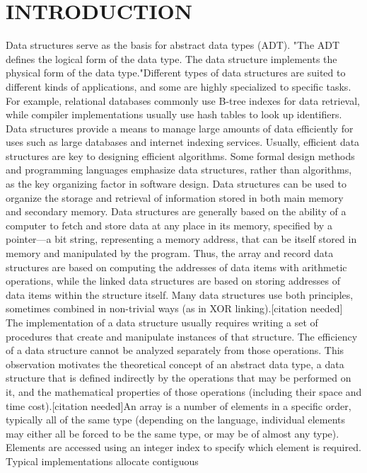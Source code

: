 \documentclass{article}
\begin{document}
\section*{INTRODUCTION}
Data structures serve as the basis for abstract data 
types (ADT). "The ADT defines the logical form of 
the data type. The data structure implements the 
physical form of the data type."Different types of data 
structures are suited to different kinds of applications, 
and some are highly specialized to specific tasks. For 
example, relational databases commonly use B-tree 
indexes for data retrieval, while compiler 
implementations usually use hash tables to look up 
identifiers. Data structures provide a means to manage 
large amounts of data efficiently for uses such as large 
databases and internet indexing services. Usually, 
efficient data structures are key to designing efficient 
algorithms. Some formal design methods and 
programming languages emphasize data structures, 
rather than algorithms, as the key organizing factor in 
software design. Data structures can be used to 
organize the storage and retrieval of information 
stored in both main memory and secondary memory. 
Data structures are generally based on the ability of a 
computer to fetch and store data at any place in its 
memory, specified by a pointer—a bit string, 
representing a memory address, that can be itself 
stored in memory and manipulated by the program. 
Thus, the array and record data structures are based on 
computing the addresses of data items with arithmetic 
operations, while the linked data structures are based 
on storing addresses of data items within the structure 
itself. Many data structures use both principles, 
sometimes combined in non-trivial ways (as in XOR 
linking).[citation needed] 
The implementation of a data structure usually 
requires writing a set of procedures that create and 
manipulate instances of that structure. The efficiency 
of a data structure cannot be analyzed separately from 
those operations. This observation motivates the 
theoretical concept of an abstract data type, a data 
structure that is defined indirectly by the operations 
that may be performed on it, and the mathematical 
properties of those operations (including their space 
and time cost).[citation needed]An array is a number 
of elements in a specific order, typically all of the 
same type (depending on the language, individual 
elements may either all be forced to be the same type, 
or may be of almost any type). Elements are accessed 
using an integer index to specify which element is 
required. Typical implementations allocate contiguous 
\end{document}
